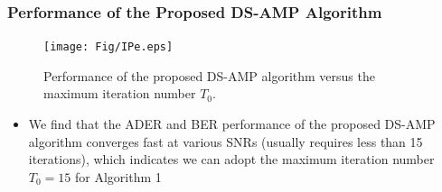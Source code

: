 \documentclass[9pt]{beamer}
\begin{document}
\begin{frame}
\frametitle{Performance of the Proposed DS-AMP Algorithm}
\begin{figure}[h]
\centering
\begin{minipage}[t]{\linewidth}
\centering
\label{fig:IPe}
\texttt{[image: Fig/IPe.eps]}\\%
\end{minipage}%
\centering
\setlength{\abovecaptionskip}{-0.3mm}
\caption{Performance of the proposed DS-AMP algorithm versus the maximum iteration number $T_0$.}
\label{fig:I}
\end{figure}
\begin{itemize}
\item
We find that the ADER and BER performance of the proposed DS-AMP algorithm converges fast at various SNRs (usually requires less than 15 iterations), which indicates we can adopt the maximum iteration number $T_0=15$ for Algorithm 1
\end{itemize}
\end{frame}
\end{document}
